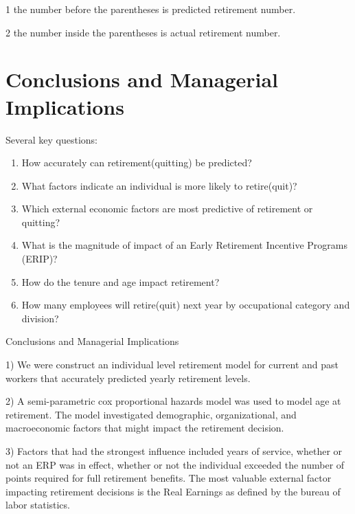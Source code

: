 \documentclass[12pt,letterpaper]{article}
\begin{document}
\begin{table}[h!]
\begin{threeparttable}
\begin{tabular}{cL{1.2cm}L{1.2cm}L{1.2cm}L{1.2cm}L{1.2cm}L{1.2cm}L{1.2cm}L{1.2cm}L{1.2cm}l}
			\bottomrule
		\end{tabular}%
		\begin{tablenotes}
			\item[1] the number before the parentheses is predicted retirement number.
			\item[2] the number inside the parentheses is actual retirement number.
		\end{tablenotes}
		
	\end{threeparttable}
	\label{tab:VQEIcocscode}
\end{table}


\section{Conclusions and Managerial Implications}

Several key questions:
\begin{enumerate}
	\item How accurately can retirement(quitting) be predicted?
	\item What factors indicate an individual is more likely to retire(quit)?
	\item Which external economic factors are most predictive of retirement or quitting?
	\item What is the magnitude  of impact of an Early Retirement Incentive Programs (ERIP)?
	\item How do the tenure and age impact retirement?
	\item How many employees will retire(quit) next year by occupational category and division?
\end{enumerate}


Conclusions and Managerial Implications

1) We were construct an individual level retirement model for current and past workers that accurately predicted yearly retirement levels.

2) A semi-parametric cox proportional hazards model was used to model age at retirement.  The model investigated demographic, organizational, and macroeconomic factors that might impact the retirement decision.

3) Factors that had the strongest influence included years of service, whether or not an ERP was in effect, whether or not the individual exceeded the number of points required for full retirement benefits.  The most valuable external factor impacting retirement decisions is the Real Earnings as defined by the bureau of labor statistics.
\end{document}
